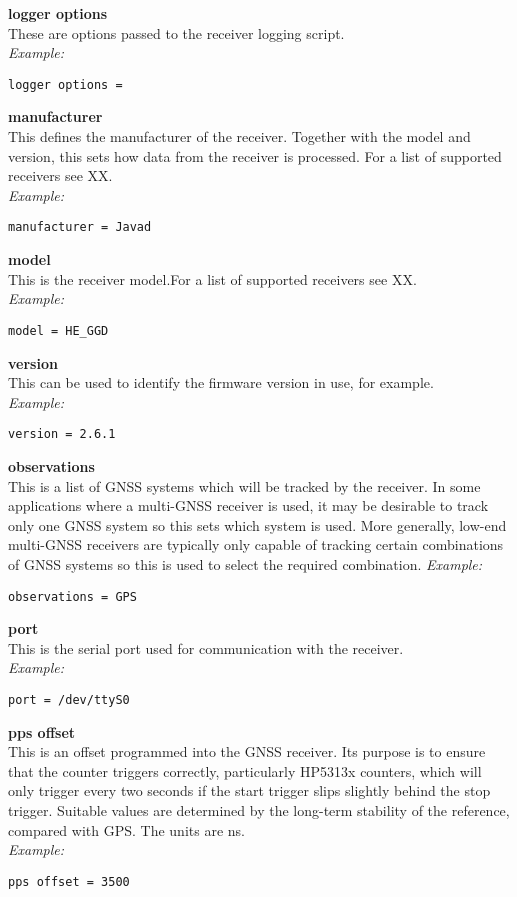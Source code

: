 {\bfseries logger options}\\
These are options passed to the receiver logging script.\\
\textit{Example:}
\begin{lstlisting}
logger options =
\end{lstlisting}

{\bfseries manufacturer}\\
This defines the manufacturer of the receiver. Together with the model and version, 
this sets how data from the receiver is processed. For a list of supported receivers
see XX.\\
\textit{Example:}
\begin{lstlisting}
manufacturer = Javad
\end{lstlisting}

{\bfseries model}\\
This is the receiver model.For a list of supported receivers
see XX.\\
\textit{Example:}
\begin{lstlisting}
model = HE_GGD
\end{lstlisting}

{\bfseries version}\\
This can be used to identify the firmware version in use, for example.\\
\textit{Example:}
\begin{lstlisting}
version = 2.6.1
\end{lstlisting}

{\bfseries observations}\\
This is a list of GNSS systems which will be tracked by the receiver. 
In some applications where a multi-GNSS receiver is used, it may be desirable to track
only one GNSS system so this sets which system is used.
More generally, low-end multi-GNSS receivers are typically only capable of tracking
certain combinations of GNSS systems so this is used to select the required combination.
\textit{Example:}
\begin{lstlisting}
observations = GPS
\end{lstlisting}

{\bfseries port}\\
This is the serial port used for communication with the receiver.\\
\textit{Example:}
\begin{lstlisting}
port = /dev/ttyS0
\end{lstlisting}

{\bfseries pps offset}\\ 
This is an offset programmed into the GNSS receiver. Its purpose is to ensure that the counter
triggers correctly, particularly HP5313x counters, which will only trigger every two seconds if the 
start trigger slips slightly behind the stop trigger. Suitable values are determined by the long-term stability of the
reference, compared with GPS.
The units are ns.\\
\textit{Example:}
\begin{lstlisting}
pps offset = 3500
\end{lstlisting}

